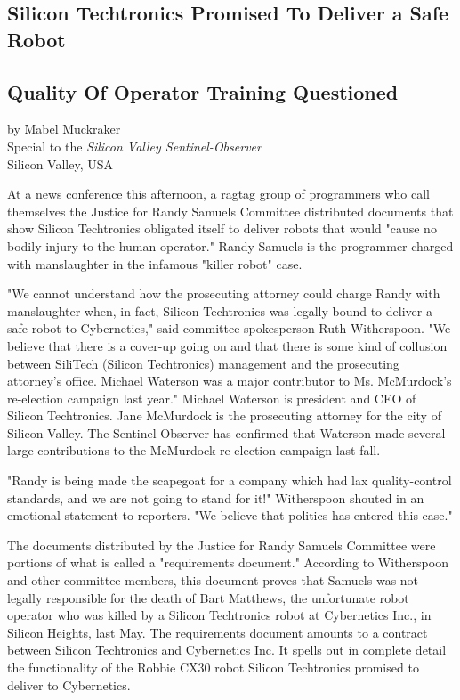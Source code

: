 \begin{center}
\section*{Silicon Techtronics Promised To Deliver a Safe Robot}
\subsection*{Quality Of Operator Training Questioned}
by Mabel Muckraker\\
Special to the \textit{Silicon Valley Sentinel-Observer}\\
Silicon Valley, USA
\end{center}

At a news conference this afternoon, a ragtag group of programmers who call themselves the Justice for Randy Samuels Committee distributed documents that show Silicon Techtronics obligated itself to deliver robots that would "cause no bodily injury to the human operator." Randy Samuels is the programmer charged with manslaughter in the infamous "killer robot" case.

"We cannot understand how the prosecuting attorney could charge Randy with manslaughter when, in fact, Silicon Techtronics was legally bound to deliver a safe robot to Cybernetics," said committee spokesperson Ruth Witherspoon. "We believe that there is a cover-up going on and that there is some kind of collusion between SiliTech (Silicon Techtronics) management and the prosecuting attorney's office. Michael Waterson was a major contributor to Ms. McMurdock's re-election campaign last year." Michael Waterson is president and CEO of Silicon Techtronics. Jane McMurdock is the prosecuting attorney for the city of Silicon Valley. The Sentinel-Observer has confirmed that Waterson made several large contributions to the McMurdock re-election campaign last fall.

"Randy is being made the scapegoat for a company which had lax quality-control standards, and we are not going to stand for it!" Witherspoon shouted in an emotional statement to reporters. "We believe that politics has entered this case."

The documents distributed by the Justice for Randy Samuels Committee were portions of what is called a "requirements document." According to Witherspoon and other committee members, this document proves that Samuels was not legally responsible for the death of Bart Matthews, the unfortunate robot operator who was killed by a Silicon Techtronics robot at Cybernetics Inc., in Silicon Heights, last May. The requirements document amounts to a contract between Silicon Techtronics and Cybernetics Inc. It spells out in complete detail the functionality of the Robbie CX30 robot Silicon Techtronics promised to deliver to Cybernetics.

